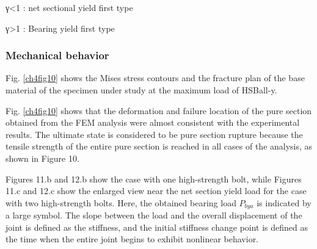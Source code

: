 γ<1 : net sectional yield first type


γ>1 : Bearing yield first type %


\subsubsection{Mechanical behavior}

Fig. \ref{ch4fig10} shows the Mises stress contours and the fracture plan of the base material of the specimen under study at the maximum load of HSBall-y.

Fig. \ref{ch4fig10} shows that the deformation and failure location of the pure section obtained from the FEM analysis were almost consistent with the experimental results. The ultimate state is considered to be pure section rupture because the tensile strength of the entire pure section is reached in all cases of the analysis, as shown in Figure 10.


Figures 11.b and 12.b show the case with one high-strength bolt, while Figures 11.c and 12.c show the enlarged view near the net section yield load for the case with two high-strength bolts. Here, the obtained bearing load $P_{bya}$ is indicated by a large symbol. The slope between the load and the overall displacement of the joint is defined as the stiffness, and the initial stiffness change point is defined as the time when the entire joint begins to exhibit nonlinear behavior.

